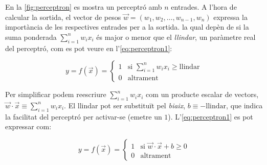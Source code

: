 \begin{refsection}
	En la \cref{fig:perceptron} es mostra un perceptró amb $n$ entrades. A l'hora de calcular la sortida, el vector de pesos $\vec{w}=(w_1,w_2,\ldots,w_{n-1},w_n)$ expressa la importància de les respectives entrades per a la sortida. la qual depèn de si la suma ponderada $\sum_{i=1}^{n}w_ix_i$ és major o menor que el \textit{llindar}, un paràmetre real del perceptró,\supercite{nielsen} com es pot veure en l'\cref{eq:perceptron1}:

	\begin{equation}
		\label{eq:perceptron1}
		y=f(\vec{x})=
		\begin{cases}
			1 & \text{si $\sum_{i=1}^{n}w_ix_i\geq\mathrm{llindar}$} \\
			0 & \text{altrament}
		\end{cases}
	\end{equation}

	Per simplificar podem reescriure $\sum_{i=1}^{n}w_ix_i$ com un producte escalar de vectors, $\vec{w}\cdot\vec{x}\equiv\sum_{i=1}^{n}w_ix_i$. El llindar pot ser substituït pel \textit{biaix}, $b\equiv-\mathrm{llindar}$, que indica la facilitat del perceptró per  activar-se (emetre un $1$).\supercite{TDSperceptron2} L'\cref{eq:perceptron1} es pot expressar com:

	\begin{equation}
		\label{eq:perceptron2}
		y=f(\vec{x})=
		\begin{cases}
			1 & \text{si $\vec{w}\cdot\vec{x}+b\geq0$} \\
			0 & \text{altrament}
		\end{cases}
	\end{equation}

	\begin{comment}
	\begin{figure}[h]
		\centering
		\begin{tikzpicture}
			[x=1.5cm, y=1.5cm, >=stealth,
				every neuron/.style={
						circle,
						draw,
						minimum size=1cm
					},
				neuron missing/.style={
						draw=none,
						scale=4,
						text height=0.333cm,
						execute at begin node=\color{black}$\vdots$
					},
			]

			\foreach \m/\l [count=\y] in {1,2,3,missing,4}
			\node [every neuron/.try, neuron \m/.try] (input-\m) at (0,2.5-\y) {};

			\foreach \m [count=\y] in {1,missing,2}
			\node [every neuron/.try, neuron \m/.try ] (hidden-\m) at (2,2-\y*1.25) {};

			\foreach \m [count=\y] in {1,missing,2}
			\node [every neuron/.try, neuron \m/.try ] (output-\m) at (4,1.5-\y) {};


\end{comment}
\end{refsection}
